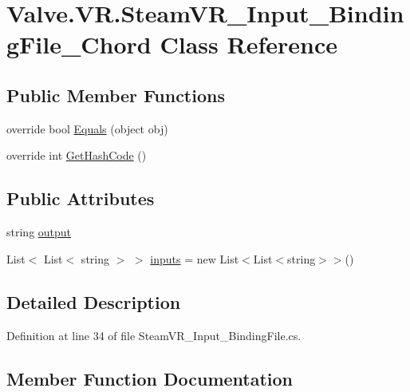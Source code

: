 \hypertarget{class_valve_1_1_v_r_1_1_steam_v_r___input___binding_file___chord}{}\section{Valve.\+V\+R.\+Steam\+V\+R\+\_\+\+Input\+\_\+\+Binding\+File\+\_\+\+Chord Class Reference}
\label{class_valve_1_1_v_r_1_1_steam_v_r___input___binding_file___chord}
\subsection*{Public Member Functions}
\begin{DoxyCompactItemize}
\item 
override bool \mbox{\hyperlink{class_valve_1_1_v_r_1_1_steam_v_r___input___binding_file___chord_a42c43ae9c2c6c690a417936f939d7509}{Equals}} (object obj)
\item 
override int \mbox{\hyperlink{class_valve_1_1_v_r_1_1_steam_v_r___input___binding_file___chord_ac5807fbe8c6cb43cee99049c0dfa13d3}{Get\+Hash\+Code}} ()
\end{DoxyCompactItemize}
\subsection*{Public Attributes}
\begin{DoxyCompactItemize}
\item 
string \mbox{\hyperlink{class_valve_1_1_v_r_1_1_steam_v_r___input___binding_file___chord_a124cdb6228c17449bfef66a87721c27e}{output}}
\item 
List$<$ List$<$ string $>$ $>$ \mbox{\hyperlink{class_valve_1_1_v_r_1_1_steam_v_r___input___binding_file___chord_a6328c4b8feea5a400cb7be8a379b3313}{inputs}} = new List$<$List$<$string$>$$>$()
\end{DoxyCompactItemize}


\subsection{Detailed Description}


Definition at line 34 of file Steam\+V\+R\+\_\+\+Input\+\_\+\+Binding\+File.\+cs.



\subsection{Member Function Documentation}
\mbox{\label{class_valve_1_1_v_r_1_1_steam_v_r___input___binding_file___chord_a42c43ae9c2c6c690a417936f939d7509}} 
